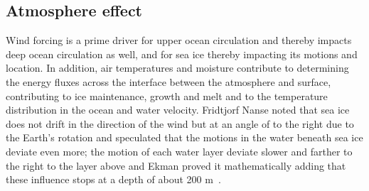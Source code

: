 \subsection{Atmosphere effect}\label{subsec:atmosphere-interconnections}
Wind forcing is a prime driver for upper ocean circulation and thereby impacts deep ocean circulation as well, and for sea ice thereby impacting its motions and location. In addition, air temperatures and moisture contribute to determining the energy fluxes across the interface between the atmosphere and surface, contributing to ice maintenance, growth and melt and to the temperature distribution in the ocean and water velocity.
Fridtjorf Nanse noted that sea ice does not drift in the direction of the wind but at an angle of to the right due to the Earth’s rotation and speculated that the motions in the water beneath sea ice deviate even more; the motion of each water layer deviate slower and farther to the right to the layer above and Ekman proved it mathematically adding that these influence stops at a depth of about 200 m~\citep[see e.g. Section 3.1 of][]{Zanotti2023}.

